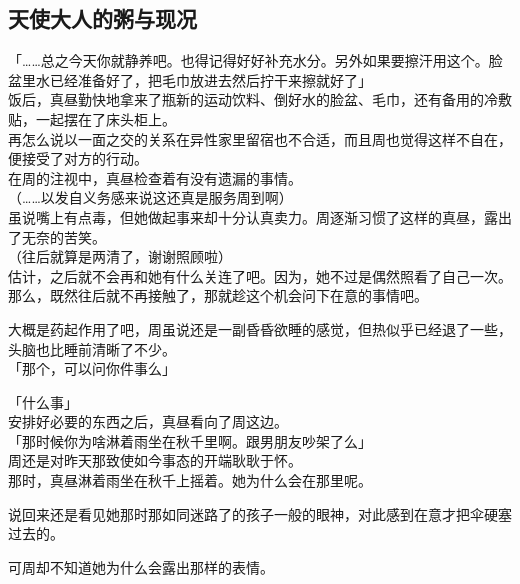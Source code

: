 \subsection{天使大人的粥与现况}

「……总之今天你就静养吧。也得记得好好补充水分。另外如果要擦汗用这个。脸盆里水已经准备好了，把毛巾放进去然后拧干来擦就好了」\\

饭后，真昼勤快地拿来了瓶新的运动饮料、倒好水的脸盆、毛巾，还有备用的冷敷贴，一起摆在了床头柜上。\\

再怎么说以一面之交的关系在异性家里留宿也不合适，而且周也觉得这样不自在，便接受了对方的行动。\\

在周的注视中，真昼检查着有没有遗漏的事情。\\

（……以发自义务感来说这还真是服务周到啊）\\

虽说嘴上有点毒，但她做起事来却十分认真卖力。周逐渐习惯了这样的真昼，露出了无奈的苦笑。\\

（往后就算是两清了，谢谢照顾啦）\\

估计，之后就不会再和她有什么关连了吧。因为，她不过是偶然照看了自己一次。\\

那么，既然往后就不再接触了，那就趁这个机会问下在意的事情吧。

大概是药起作用了吧，周虽说还是一副昏昏欲睡的感觉，但热似乎已经退了一些，头脑也比睡前清晰了不少。\\

「那个，可以问你件事么」

「什么事」\\

安排好必要的东西之后，真昼看向了周这边。\\

「那时候你为啥淋着雨坐在秋千里啊。跟男朋友吵架了么」\\

周还是对昨天那致使如今事态的开端耿耿于怀。\\

那时，真昼淋着雨坐在秋千上摇着。她为什么会在那里呢。

说回来还是看见她那时那如同迷路了的孩子一般的眼神，对此感到在意才把伞硬塞过去的。

可周却不知道她为什么会露出那样的表情。\\

